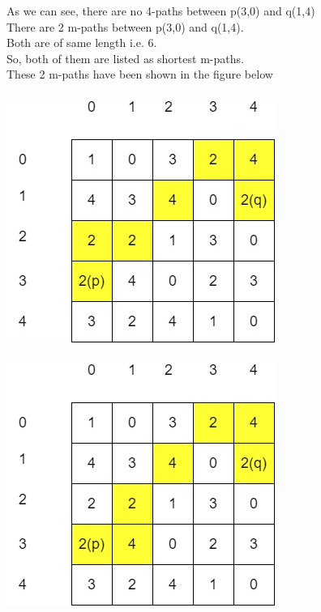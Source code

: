 \documentclass[12pt]{article}
\begin{document}
As we can see, there are no 4-paths between p(3,0) and q(1,4) \\ 
There are 2 m-paths between p(3,0) and q(1,4). \\ 
Both are of same length i.e. 6. \\ 
So, both of them are listed as shortest m-paths. \\ 
These 2 m-paths have been shown in the figure below \\ \\
\includegraphics[width=0.5\linewidth]{m-path1.jpg} \\ \\
\includegraphics[width=0.5\linewidth]{m-path2.jpg} \\ \\
\end{document}
